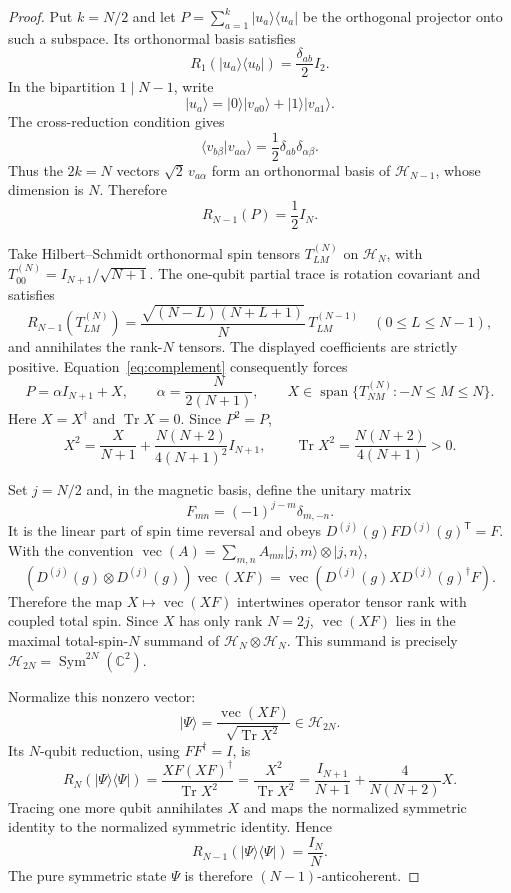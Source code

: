 \documentclass[11pt]{article}
\newcommand{\Tr}{\operatorname{Tr}}
\newcommand{\Sym}{\operatorname{Sym}}
\newcommand{\vecop}{\operatorname{vec}}
\begin{document}
\begin{proof}
Put $k=N/2$ and let $P=\sum_{a=1}^k|u_a\rangle\langle u_a|$ be the orthogonal projector onto such a subspace. Its orthonormal basis satisfies
\[
 R_1(|u_a\rangle\langle u_b|)=\frac{\delta_{ab}}2 I_2.
\]
In the bipartition $1\mid N-1$, write
\[
 |u_a\rangle=|0\rangle|v_{a0}\rangle+|1\rangle|v_{a1}\rangle.
\]
The cross-reduction condition gives
\[
 \langle v_{b\beta}|v_{a\alpha}\rangle
 =\frac12\delta_{ab}\delta_{\alpha\beta}.
\]
Thus the $2k=N$ vectors $\sqrt2\,v_{a\alpha}$ form an orthonormal basis of $\mathcal H_{N-1}$, whose dimension is $N$. Therefore
\begin{equation}\label{eq:complement}
 R_{N-1}(P)=\frac12 I_N.
\end{equation}

Take Hilbert--Schmidt orthonormal spin tensors $T^{(N)}_{LM}$ on $\mathcal H_N$, with $T^{(N)}_{00}=I_{N+1}/\sqrt{N+1}$. The one-qubit partial trace is rotation covariant and satisfies
\[
 R_{N-1}(T^{(N)}_{LM})
 =\frac{\sqrt{(N-L)(N+L+1)}}{N}\,T^{(N-1)}_{LM}
 \quad(0\le L\le N-1),
\]
and annihilates the rank-$N$ tensors. The displayed coefficients are strictly positive. Equation~\eqref{eq:complement} consequently forces
\[
 P=\alpha I_{N+1}+X,\qquad
 \alpha=\frac{N}{2(N+1)},\qquad
 X\in\operatorname{span}\{T^{(N)}_{NM}: -N\le M\le N\}.
\]
Here $X=X^\dagger$ and $\Tr X=0$. Since $P^2=P$,
\begin{equation}\label{eq:X2}
 X^2=\frac{X}{N+1}+\frac{N(N+2)}{4(N+1)^2}I_{N+1},
 \qquad \Tr X^2=\frac{N(N+2)}{4(N+1)}>0.
\end{equation}

Set $j=N/2$ and, in the magnetic basis, define the unitary matrix
\[
 F_{mn}=(-1)^{j-m}\delta_{m,-n}.
\]
It is the linear part of spin time reversal and obeys $D^{(j)}(g)F D^{(j)}(g)^{\mathsf T}=F$. With the convention
$\vecop(A)=\sum_{m,n}A_{mn}|j,m\rangle\otimes|j,n\rangle$,
\[
 (D^{(j)}(g)\otimes D^{(j)}(g))\vecop(XF)
 =\vecop(D^{(j)}(g)X D^{(j)}(g)^\dagger F).
\]
Therefore the map $X\mapsto\vecop(XF)$ intertwines operator tensor rank with coupled total spin. Since $X$ has only rank $N=2j$, $\vecop(XF)$ lies in the maximal total-spin-$N$ summand of $\mathcal H_N\otimes\mathcal H_N$. This summand is precisely $\mathcal H_{2N}=\Sym^{2N}(\mathbb C^2)$.

Normalize this nonzero vector:
\[
 |\Psi\rangle=\frac{\vecop(XF)}{\sqrt{\Tr X^2}}\in\mathcal H_{2N}.
\]
Its $N$-qubit reduction, using $FF^\dagger=I$, is
\[
 R_N(|\Psi\rangle\langle\Psi|)
 =\frac{XF(XF)^\dagger}{\Tr X^2}
 =\frac{X^2}{\Tr X^2}
 =\frac{I_{N+1}}{N+1}+\frac{4}{N(N+2)}X.
\]
Tracing one more qubit annihilates $X$ and maps the normalized symmetric identity to the normalized symmetric identity. Hence
\[
 R_{N-1}(|\Psi\rangle\langle\Psi|)=\frac{I_N}{N}.
\]
The pure symmetric state $\Psi$ is therefore $(N-1)$-anticoherent.
\end{proof}
\end{document}
